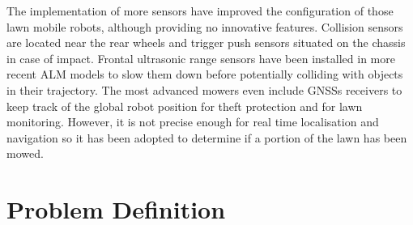 The implementation of more sensors have improved the configuration of those lawn mobile robots, although providing no innovative features.
Collision sensors are located near the rear wheels and trigger push sensors situated on the chassis in case of impact.
Frontal ultrasonic range sensors have been installed in more recent \gls{ALM} models to slow them down before potentially colliding with objects in their trajectory.
The most advanced mowers even include \Glspl{GNSS} receivers to keep track of the global robot position for theft protection and for lawn monitoring.
However, it is not precise enough for real time localisation and navigation so it has been adopted to determine if a portion of the lawn has been mowed.





\section{Problem Definition}

